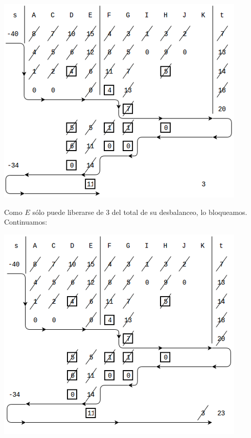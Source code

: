 \documentclass[10pt,a4paper]{article}
\begin{document}
\begin{center}

    \begin{adjustbox}{max size={\textwidth}{\textheight}}
        \includegraphics{definitions/wave_b8.jpg}
        \end{adjustbox}
    
\end{center}

Como $E$ sólo puede liberarse de $3$ del total de su desbalanceo, lo bloqueamos. Continuamos:

\begin{center}

    \begin{adjustbox}{max size={\textwidth}{\textheight}}
        \includegraphics{definitions/wave_b9.jpg}
        \end{adjustbox}
    
\end{center}
\end{document}
